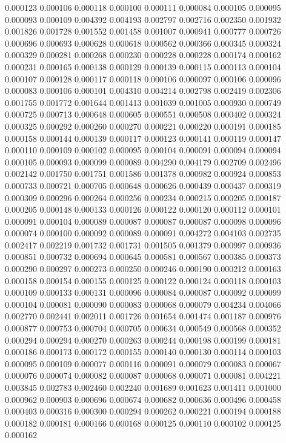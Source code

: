 0.000123
0.000106
0.000118
0.000100
0.000111
0.000084
0.000105
0.000095
0.000093
0.000109
0.004392
0.004193
0.002797
0.002716
0.002350
0.001932
0.001826
0.001728
0.001552
0.001458
0.001007
0.000941
0.000777
0.000726
0.000696
0.000693
0.000628
0.000618
0.000562
0.000366
0.000345
0.000324
0.000329
0.000281
0.000268
0.000230
0.000228
0.000228
0.000174
0.000162
0.000231
0.000165
0.000138
0.000129
0.000139
0.000115
0.000113
0.000104
0.000107
0.000128
0.000117
0.000118
0.000106
0.000097
0.000106
0.000096
0.000083
0.000106
0.000101
0.004310
0.004214
0.002798
0.002419
0.002306
0.001755
0.001772
0.001644
0.001413
0.001039
0.001005
0.000930
0.000749
0.000725
0.000713
0.000648
0.000605
0.000551
0.000508
0.000402
0.000324
0.000325
0.000292
0.000260
0.000270
0.000221
0.000220
0.000191
0.000185
0.000158
0.000144
0.000139
0.000117
0.000123
0.000141
0.000119
0.000147
0.000110
0.000109
0.000102
0.000095
0.000104
0.000091
0.000094
0.000094
0.000105
0.000093
0.000099
0.000089
0.004290
0.004179
0.002709
0.002496
0.002142
0.001750
0.001751
0.001586
0.001378
0.000982
0.000924
0.000853
0.000733
0.000721
0.000705
0.000648
0.000626
0.000439
0.000437
0.000319
0.000309
0.000296
0.000264
0.000256
0.000234
0.000215
0.000205
0.000187
0.000205
0.000148
0.000133
0.000126
0.000122
0.000120
0.000112
0.000101
0.000091
0.000104
0.000089
0.000087
0.000087
0.000087
0.000098
0.000096
0.000074
0.000100
0.000092
0.000089
0.000091
0.004272
0.004103
0.002735
0.002417
0.002219
0.001732
0.001731
0.001505
0.001379
0.000997
0.000936
0.000851
0.000732
0.000694
0.000645
0.000581
0.000567
0.000385
0.000373
0.000290
0.000297
0.000273
0.000250
0.000246
0.000190
0.000212
0.000163
0.000158
0.000154
0.000155
0.000125
0.000122
0.000124
0.000118
0.000103
0.000109
0.000133
0.000131
0.000096
0.000084
0.000087
0.000092
0.000099
0.000104
0.000081
0.000090
0.000083
0.000068
0.000079
0.004234
0.004066
0.002770
0.002441
0.002011
0.001726
0.001654
0.001474
0.001187
0.000976
0.000877
0.000753
0.000704
0.000705
0.000634
0.000549
0.000568
0.000352
0.000294
0.000294
0.000270
0.000263
0.000244
0.000198
0.000199
0.000181
0.000186
0.000173
0.000172
0.000155
0.000140
0.000130
0.000114
0.000103
0.000095
0.000109
0.000077
0.000116
0.000091
0.000079
0.000083
0.000067
0.000076
0.000074
0.000082
0.000087
0.000068
0.000071
0.000081
0.004221
0.003845
0.002783
0.002460
0.002240
0.001689
0.001623
0.001411
0.001000
0.000962
0.000903
0.000696
0.000674
0.000682
0.000636
0.000496
0.000458
0.000403
0.000316
0.000300
0.000294
0.000262
0.000221
0.000194
0.000188
0.000182
0.000181
0.000166
0.000168
0.000125
0.000110
0.000102
0.000125
0.000162
